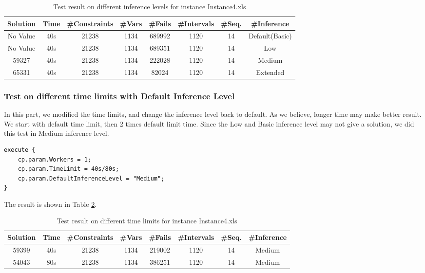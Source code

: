 \documentclass[a4paper, 12pt]{article}
\begin{document}
\begin{table}
    \centering
    \caption{Test result on different inference levels for instance Instance4.xls}
    \label{diffInfer4}
    \begin{tabular}{|c|c|c|c|c|c|c|c|}
        \hline
        Solution & Time & \#Constraints & \#Vars & \#Fails & \#Intervals & \#Seq. & \#Inference \\
        \hline
        No Value & 40s & 21238 & 1134 & 689992 & 1120 & 14 & Default(Basic) \\
        \hline 
        No Value & 40s & 21238 & 1134 & 689351 & 1120 & 14 & Low \\
        \hline
        59327 & 40s & 21238 & 1134 & 222028 & 1120 & 14 & Medium \\
        \hline
        65331 & 40s & 21238 & 1134 & 82024 & 1120 & 14 & Extended \\
        \hline
    \end{tabular}
\end{table}

\subsubsection{Test on different time limits with Default Inference Level}

In this part, we modified the time limits, and change the inference level back to default. As we believe, longer time may make better result. We start with default time limit, then 2 times default limit time. Since the Low and Basic inference level may not give a solution, we did this test in Medium inference level. 

\begin{lstlisting}
execute {
    cp.param.Workers = 1;
    cp.param.TimeLimit = 40s/80s; 
    cp.param.DefaultInferenceLevel = "Medium";
}
\end{lstlisting}

The result is shown in Table \ref{diffTime4}.
\begin{table}
    \centering
    \caption{Test result on different time limits for instance Instance4.xls}
    \label{diffTime4}
    \begin{tabular}{|c|c|c|c|c|c|c|c|}
        \hline
        Solution & Time & \#Constraints & \#Vars & \#Fails & \#Intervals & \#Seq. & \#Inference \\
        \hline
        59399 & 40s & 21238 & 1134 & 219002 & 1120 & 14 & Medium \\
        \hline 
        54043 & 80s & 21238 & 1134 & 386251 & 1120 & 14 & Medium \\
        \hline
        \hline
    \end{tabular}
\end{table}
\end{document}
